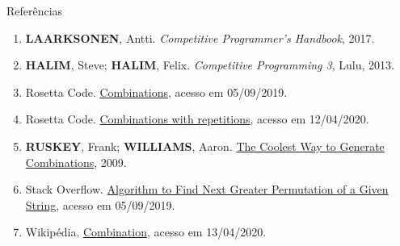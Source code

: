 \begin{frame}[fragile]{Referências}

    \begin{enumerate}
        \item \textbf{LAARKSONEN}, Antti. \textit{Competitive Programmer's Handbook}, 2017.

        \item \textbf{HALIM}, Steve; \textbf{HALIM}, Felix. \textit{Competitive Programming 3}, Lulu, 2013.

        \item Rosetta Code. \href{http://rosettacode.org/wiki/Combinations#C.2B.2B}{Combinations},
            acesso em 05/09/2019.

        \item Rosetta Code. \href{http://rosettacode.org/wiki/Combinations_with_repetitions#C.2B.2B}{Combinations with repetitions}, acesso em 12/04/2020.

        \item \textbf{RUSKEY}, Frank; \textbf{WILLIAMS}, Aaron. \href{https://www.semanticscholar.org/paper/The-coolest-way-to-generate-combinations-Ruskey-Williams/546c00847913a5c62feb6dd2d3337ce57c4eefb5}{The Coolest Way to Generate Combinations}, 2009.

        \item Stack Overflow. \href{https://stackoverflow.com/questions/1622532/algorithm-to-find-next-greater-permutation-of-a-given-string}{Algorithm to Find Next Greater Permutation of a Given String}, acesso em 05/09/2019.

        \item Wikipédia. \href{https://en.wikipedia.org/wiki/Combination}{Combination}, acesso em
            13/04/2020.

    \end{enumerate}

\end{frame}
